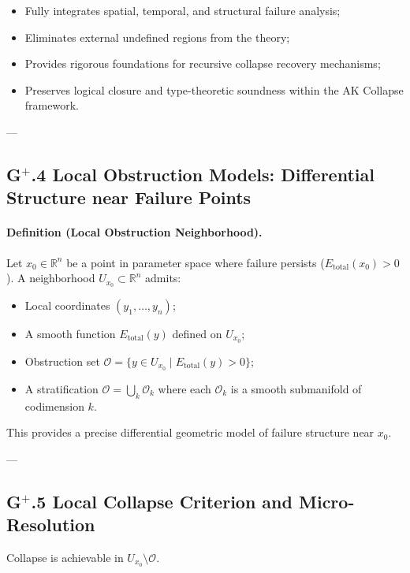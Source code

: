 \documentclass[11pt]{article}
\begin{document}
\begin{itemize}
    \item Fully integrates spatial, temporal, and structural failure analysis;
    \item Eliminates external undefined regions from the theory;
    \item Provides rigorous foundations for recursive collapse recovery mechanisms;
    \item Preserves logical closure and type-theoretic soundness within the AK Collapse framework.
\end{itemize}

---

\subsection*{G$^{+}$.4 Local Obstruction Models: Differential Structure near Failure Points}

\paragraph{Definition (Local Obstruction Neighborhood).}

Let $x_0 \in \mathbb{R}^n$ be a point in parameter space where failure persists ($E_{\mathrm{total}}(x_0) > 0$).  
A neighborhood $U_{x_0} \subset \mathbb{R}^n$ admits:

\begin{itemize}
    \item Local coordinates $(y_1, \ldots, y_n)$;
    \item A smooth function $E_{\mathrm{total}}(y)$ defined on $U_{x_0}$;
    \item Obstruction set $\mathcal{O} = \{ y \in U_{x_0} \mid E_{\mathrm{total}}(y) > 0 \}$;
    \item A stratification $\mathcal{O} = \bigcup_{k} \mathcal{O}_k$ where each $\mathcal{O}_k$ is a smooth submanifold of codimension $k$.
\end{itemize}

This provides a precise differential geometric model of failure structure near $x_0$.

---

\subsection*{G$^{+}$.5 Local Collapse Criterion and Micro-Resolution}

Collapse is achievable in $U_{x_0} \setminus \mathcal{O}$.
\end{document}
